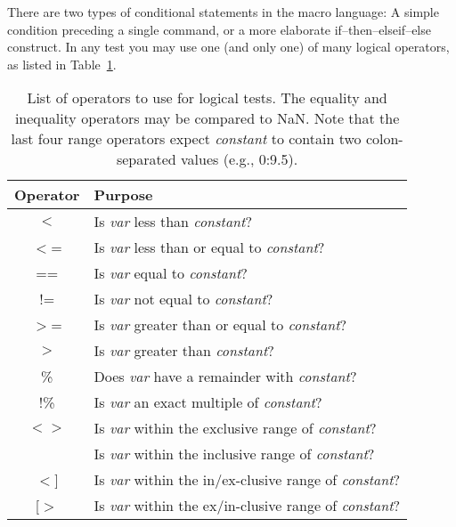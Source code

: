 There are two types of conditional statements in the macro language: A simple condition
preceding a single command, or a more elaborate if--then--elseif--else construct.  In any test you
may use one (and only one) of many logical operators, as listed in Table~\ref{tbl:custop}.
\begin{table}[H]
\small
\centering
\begin{tabular}{|c|l|} \hline
Operator 	& 	Purpose					\\ \hline
$<$ 		& 	Is \emph{var} less than \emph{constant}?		\\ \hline
$<$= 		& 	Is \emph{var} less than or equal to \emph{constant}?		\\ \hline
== 		& 	Is \emph{var} equal to \emph{constant}?		\\ \hline
!= 		& 	Is \emph{var} not equal to \emph{constant}?		\\ \hline
$>$= 		& 	Is \emph{var} greater than or equal to \emph{constant}?		\\ \hline
$>$ 		& 	Is \emph{var} greater than \emph{constant}?		\\ \hline
\% 		& 	Does \emph{var} have a remainder with \emph{constant}?		\\ \hline
!\% 		& 	Is \emph{var} an exact multiple of \emph{constant}?		\\ \hline
$<>$ 		& 	Is \emph{var} within the exclusive range of \emph{constant}?	\\ \hline
[] 		& 	Is \emph{var} within the inclusive range of \emph{constant}?	\\ \hline
$<$] 		& 	Is \emph{var} within the in/ex-clusive range of \emph{constant}?	\\ \hline
[$>$		& 	Is \emph{var} within the ex/in-clusive range of \emph{constant}?	\\ \hline
\end{tabular}
\label{tbl:custop}
\caption{List of operators to use for logical tests.  The equality and inequality operators
may be compared to NaN.  Note that the last four range operators
expect \emph{constant} to contain two colon-separated values (e.g., 0:9.5).}
\end{table} 

